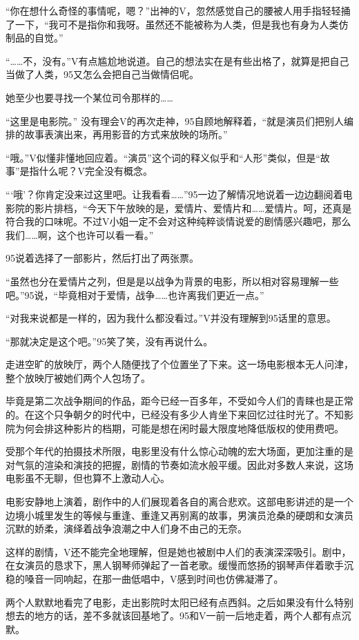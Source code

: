 “你在想什么奇怪的事情呢，嗯？”出神的V，忽然感觉自己的腰被人用手指轻轻捅了一下，“我可不是指你和我呀。虽然还不能被称为人类，但是我也有身为人类仿制品的自觉。”

“……不，没有。”V有点尴尬地说道。自己的想法实在是有些出格了，就算是把自己当做了人类，95又怎么会把自己当做情侣呢。

她至少也要寻找一个某位司令那样的……

“这里是电影院。” 没有理会V的再次走神，95自顾地解释着，“就是演员们把别人编排的故事表演出来，再用影音的方式来放映的场所。” 

“哦。”V似懂非懂地回应着。“演员”这个词的释义似乎和“人形”类似，但是“故事”是指什么呢？V完全没有概念。

“‘哦’？你肯定没来过这里吧。让我看看……”95一边了解情况地说着一边边翻阅着电影院的影片排档，“今天下午放映的是，爱情片、爱情片和……爱情片。呵，还真是符合我的口味呢。不过V小姐一定不会对这种纯粹谈情说爱的剧情感兴趣吧，那么我们……啊，这个也许可以看一看。”

95说着选择了一部影片，然后打出了两张票。

“虽然也分在爱情片之列，但是是以战争为背景的电影，所以相对容易理解一些吧。”95说，“毕竟相对于爱情，战争……也许离我们更近一点。”

“对我来说都是一样的，因为我什么都没看过。”V并没有理解到95话里的意思。

“那就决定是这个吧。”95笑了笑，没有再说什么。

走进空旷的放映厅，两个人随便找了个位置坐了下来。这一场电影根本无人问津，整个放映厅被她们两个人包场了。

毕竟是第二次战争期间的作品，距今已经一百多年，不受如今人们的青睐也是正常的。在这个只争朝夕的时代中，已经没有多少人肯坐下来回忆过往时光了。不知影院为何会排这种影片的档期，可能是想在闲时最大限度地降低版权的使用费吧。

受那个年代的拍摄技术所限，电影里没有什么惊心动魄的宏大场面，更加注重的是对气氛的渲染和演技的把握，剧情的节奏如流水般平缓。因此对多数人来说，这场电影虽不无聊，但也算不上激动人心。

电影安静地上演着，剧作中的人们展现着各自的离合悲欢。这部电影讲述的是一个边境小城里发生的等候与重逢、重逢又再别离的故事，男演员沧桑的硬朗和女演员沉默的娇柔，演绎着战争浪潮之中人们身不由己的无奈。

这样的剧情，V还不能完全地理解，但是她也被剧中人们的表演深深吸引。剧中，在女演员的恳求下，黑人钢琴师弹起了一首老歌。缓慢而悠扬的钢琴声伴着歌手沉稳的嗓音一同响起，在那一曲低唱中，V感到时间也仿佛凝滞了。

两个人默默地看完了电影，走出影院时太阳已经有点西斜。之后如果没有什么特别想去的地方的话，差不多就该回基地了。95和V一前一后地走着，两个人都有点沉默。

